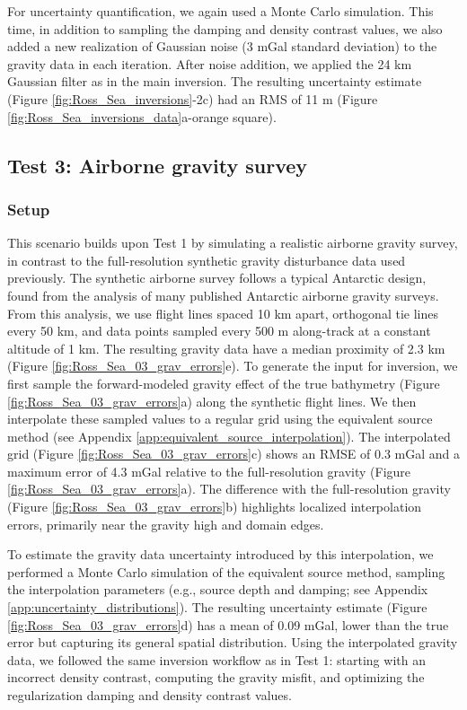 \documentclass[tc, manuscript]{copernicus}
\begin{document}
For uncertainty quantification, we again used a Monte Carlo simulation. This time, in addition to sampling the damping and density contrast values, we also added a new realization of Gaussian noise (3 mGal standard deviation) to the gravity data in each iteration. After noise addition, we applied the 24 km Gaussian filter as in the main inversion. The resulting uncertainty estimate (Figure \ref{fig:Ross_Sea_inversions}-2c) had an RMS of 11 m (Figure \ref{fig:Ross_Sea_inversions_data}a-orange square).

\subsection{Test 3: Airborne gravity survey}
\subsubsection{Setup}
This scenario builds upon Test 1 by simulating a realistic airborne gravity survey, in contrast to the full-resolution synthetic gravity disturbance data used previously. The synthetic airborne survey follows a typical Antarctic design, found from the analysis of many published Antarctic airborne gravity surveys. From this analysis, we use flight lines spaced 10 km apart, orthogonal tie lines every 50 km, and data points sampled every 500 m along-track at a constant altitude of 1 km. The resulting gravity data have a median proximity of 2.3 km (Figure \ref{fig:Ross_Sea_03_grav_errors}e).
To generate the input for inversion, we first sample the forward-modeled gravity effect of the true bathymetry (Figure \ref{fig:Ross_Sea_03_grav_errors}a) along the synthetic flight lines. We then interpolate these sampled values to a regular grid using the equivalent source method (see Appendix \ref{app:equivalent_source_interpolation}). The interpolated grid (Figure \ref{fig:Ross_Sea_03_grav_errors}c) shows an RMSE of 0.3 mGal and a maximum error of 4.3 mGal relative to the full-resolution gravity (Figure \ref{fig:Ross_Sea_03_grav_errors}a). The difference with the full-resolution gravity (Figure \ref{fig:Ross_Sea_03_grav_errors}b) highlights localized interpolation errors, primarily near the gravity high and domain edges.

To estimate the gravity data uncertainty introduced by this interpolation, we performed a Monte Carlo simulation of the equivalent source method, sampling the interpolation parameters (e.g., source depth and damping; see Appendix \ref{app:uncertainty_distributions}). The resulting uncertainty estimate (Figure \ref{fig:Ross_Sea_03_grav_errors}d) has a mean of 0.09 mGal, lower than the true error but capturing its general spatial distribution. Using the interpolated gravity data, we followed the same inversion workflow as in Test 1: starting with an incorrect density contrast, computing the gravity misfit, and optimizing the regularization damping and density contrast values.
\end{document}
